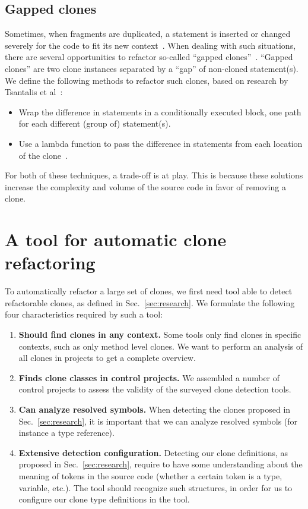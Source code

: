 \documentclass[sigconf,review,anonymous]{acmart}
\begin{document}
\subsection{Gapped clones} \label{sec:t3r}
Sometimes, when fragments are duplicated, a statement is inserted or changed severely for the code to fit its new context~\cite{roy2007survey}. When dealing with such situations, there are several opportunities to refactor so-called ``gapped clones''~\cite{ueda2002detection, zhao2018automatic}. ``Gapped clones'' are two clone instances separated by a ``gap'' of non-cloned statement(s). We define the following methods to refactor such clones, based on research by Tsantalis et al~\cite{tsantalis2015assessing}:
\begin{itemize}
  \item Wrap the difference in statements in a conditionally executed block, one path for each different (group of) statement(s).
  \item Use a lambda function to pass the difference in statements from each location of the clone~\cite{tsantalis2017clone}.
\end{itemize}
For both of these techniques, a trade-off is at play. This is because these solutions increase the complexity and volume of the source code in favor of removing a clone.

\section{A tool for automatic clone refactoring}\label{sec:clonerefactor}

To automatically refactor a large set of clones, we first need tool able to detect refactorable clones, as defined in Sec.~\ref{sec:research}.  We formulate the following four characteristics required by such a tool:
\begin{enumerate}
    \item \textbf{Should find clones in any context.} Some tools only find clones in specific contexts, such as only method level clones. We want to perform an analysis of all clones in projects to get a complete overview.
\item \textbf{Finds clone classes in control projects.} We assembled a number of control projects to assess the validity of the surveyed clone detection tools.
\item \textbf{Can analyze resolved symbols.} When detecting the clones proposed in Sec.~\ref{sec:research}, it is important that we can analyze resolved symbols (for instance a type reference).
\item \textbf{Extensive detection configuration.} Detecting our clone definitions, as proposed in Sec.~\ref{sec:research}, require to have some understanding about the meaning of tokens in the source code (whether a certain token is a type, variable, etc.). The tool should recognize such structures, in order for us to configure our clone type definitions in the tool.
\end{enumerate}
\end{document}
